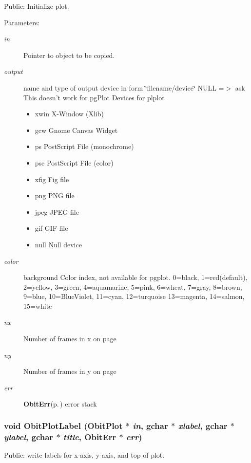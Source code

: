 Public: Initialize plot. 

\begin{Desc}
\item[Parameters:]
\begin{description}
\item[{\em in}]Pointer to object to be copied. \item[{\em output}]name and type of output device in form \char`\"{}filename/device\char`\"{} NULL =$>$ ask This doesn't work for pg\-Plot Devices for plplot \begin{itemize}
\item xwin X-Window (Xlib) \item gcw Gnome Canvas Widget \item ps Post\-Script File (monochrome) \item psc Post\-Script File (color) \item xfig Fig file \item png PNG file \item jpeg JPEG file \item gif GIF file \item null Null device \end{itemize}
\item[{\em color}]background Color index, not available for pgplot. 0=black, 1=red(default), 2=yellow, 3=green, 4=aquamarine, 5=pink, 6=wheat, 7=gray, 8=brown, 9=blue, 10=Blue\-Violet, 11=cyan, 12=turquoise 13=magenta, 14=salmon, 15=white \item[{\em nx}]Number of frames in x on page \item[{\em ny}]Number of frames in y on page \item[{\em err}]{\bf Obit\-Err}{\rm (p.\,\pageref{structObitErr})} error stack \end{description}
\end{Desc}
\subsubsection{\setlength{\rightskip}{0pt plus 5cm}void Obit\-Plot\-Label ({\bf Obit\-Plot} $\ast$ {\em in}, gchar $\ast$ {\em xlabel}, gchar $\ast$ {\em ylabel}, gchar $\ast$ {\em title}, {\bf Obit\-Err} $\ast$ {\em err})}\label{ObitPlot_8h_a16}


Public: write labels for x-axis, y-axis, and top of plot. 


